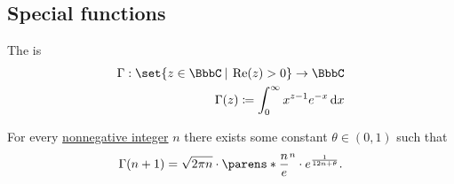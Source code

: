 \subsection{Special functions}\label{subsec:special_functions}

\begin{definition}\label{def:gamma_function}
  The  is
  \begin{equation*}
    \begin{aligned}
      \Gamma: \set{ z \in \BbbC \given \real(z) > 0 } \to \BbbC \\
      \Gamma(z) \coloneqq \int_0^\infty x^{z-1} e^{-x} \dl x
    \end{aligned}
  \end{equation*}
\end{definition}

\begin{theorem}\label{thm:stirlings_gamma_approximation}
  For every \hyperref[def:integer_signum]{nonnegative integer} \( n \) there exists some constant \( \theta \in (0, 1) \) such that
  \begin{equation*}
    \Gamma(n + 1) = \sqrt{2 \pi n} \cdot \parens*{ \frac n e }^n \cdot e^{\frac 1 {12n + \theta}}.
  \end{equation*}
\end{theorem}
